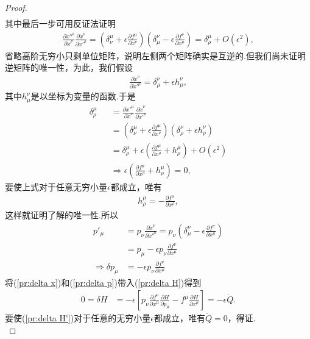 \begin{proof}
\begin{eqnarray*}
		\end{eqnarray*}
		其中最后一步可用反证法证明
		\begin{eqnarray*}
			\frac{\partial \dot{x}'^\mu}{\partial \dot{x}^\nu}\frac{\partial \dot{x}^\nu}{\partial \dot{x}'^\rho}=\left(\delta^\mu_\nu+\epsilon \frac{\partial f^\mu}{\partial x^\nu}\right)\left(\delta^\nu_\mu-\epsilon \frac{\partial f^\nu}{\partial x^\mu}\right)=\delta^\mu_\rho+O(\epsilon^2),
		\end{eqnarray*}
		省略高阶无穷小只剩单位矩阵，说明左侧两个矩阵确实是互逆的.但我们尚未证明逆矩阵的唯一性，为此，我们假设
		\begin{eqnarray*}
			\frac{\partial \dot{x}^\nu}{\partial \dot{x}'^\mu}=\delta^\nu_\mu+\epsilon h^\nu_\mu,
		\end{eqnarray*}
		其中$h^\nu_\mu$是以坐标为变量的函数.于是
		\begin{eqnarray*}
			\delta^\mu_\rho&&=\frac{\partial \dot{x}'^\mu}{\partial \dot{x}^\nu}\frac{\partial \dot{x}^\nu}{\partial \dot{x}'^\rho}\\
			&&=\left(\delta^\mu_\nu+\epsilon \frac{\partial f^\mu}{\partial x^\nu}\right)\left(\delta^\nu_\rho+\epsilon h^\nu_\rho\right)\\
			&&=\delta^\mu_\rho+\epsilon\left(\frac{\partial f^\mu}{\partial x^\rho}+h^\mu_\rho\right)+O(\epsilon^2)\\
			&&\Rightarrow\epsilon\left(\frac{\partial f^\mu}{\partial x^\rho}+h^\mu_\rho\right)=0,
		\end{eqnarray*}
		要使上式对于任意无穷小量$\epsilon$都成立，唯有	
		\begin{eqnarray*}
			h^\mu_\rho=-\frac{\partial f^\mu}{\partial x^\rho},
		\end{eqnarray*}
		这样就证明了解的唯一性.所以
		\begin{equation}\label{pr:delta p}
		\begin{split}
			p'_\mu&=p_\nu\frac{\partial \dot{x}^\nu}{\partial \dot{x}'^\mu}=p_\nu\left(\delta^\nu_\mu-\epsilon \frac{\partial f^\nu}{\partial x^\mu}\right)\\
			&=p_\mu-\epsilon p_\nu\frac{\partial f^\nu}{\partial x^\mu}\\
			\Rightarrow\delta p_\mu&=-\epsilon p_\nu\frac{\partial f^\nu}{\partial x^\mu}
		\end{split}
		\end{equation}	
		将(\ref{pr:delta x})和(\ref{pr:delta p})带入(\ref{pr:delta H})得到
		\begin{equation}\label{pr:delta H'}
		\begin{split}
			0=\delta H&=-\epsilon\left[p_\nu\frac{\partial f^\nu}{\partial x^\mu}\frac{\partial H}{\partial p_\mu}-f^\mu\frac{\partial H}{\partial x^\mu}\right]=-\epsilon\dot{Q}.
		\end{split}
		\end{equation}
		要使(\ref{pr:delta H'})对于任意的无穷小量$\epsilon$都成立，唯有$\dot{Q}=0$，得证.\\
		\end{proof}
	
